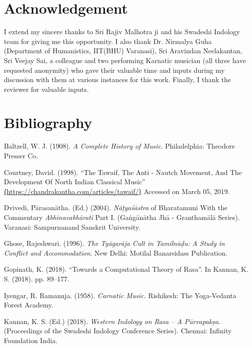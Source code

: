 {\section*{Acknowledgement}

I extend my sincere thanks to Sri Rajiv Malhotra ji and his Swadeshi Indology team for giving me this opportunity. I also thank Dr. Nirmalya Guha (Department of Humanistics, IIT(BHU) Varanasi), Sri Aravindan Neelakantan, Sri Veejay Sai, a colleague and two performing Karnatic musician (all three have requested anonymity) who gave their valuable time and inputs during my discussion with them at various instances for this work. Finally, I thank the reviewer for valuable inputs.


\section*{Bibliography}

\begin{thebibliography}{99}
\itemsep=0pt

  Baltzell, W. J. (1908). \textit{A Complete History of Music}. Philadelphia: Theodore Presser Co.

  Courtney, David. (1998). “The Tawaif, The Anti - Nautch Movement, And The Development Of North Indian Classical Music” \url{⟨https://chandrakantha.com/articles/tawaif/⟩} Accessed on March 05, 2019.

  Dvivedi, Pārasanātha. (Ed.) (2004). \textit{Nāṭyaśāstra} of Bharatamuni With the Commentary \textit{Abhinavabhāratī }Part I. (Gaṅgānātha Jhā - Granthamālā Series). Varanasi: Sampurnanand Sanskrit University.

  Ghose, Rajeshwari. (1996). \textit{The Tyāgarāja Cult in Tamilnāḍu: A Study in Conflict and Accommodation}. New Delhi: Motilal Banarsidass Publication.

  Gopinath, K. (2018). “Towards a Computational Theory of Rasa”. In Kannan, K. S. (2018). pp. 89--177.

  Iyengar, R. Ramanuja. (1958). \textit{Carnatic Music.} Rishikesh: The Yoga-Vedanta Forest Academy.

  Kannan, K. S. (Ed.) (2018). \textit{Western Indology on Rasa – A Pūrvapakṣa}. (Proceedings of the Swadeshi Indology Conference Series). Chennai: Infinity Foundation India.


\end{thebibliography}}
